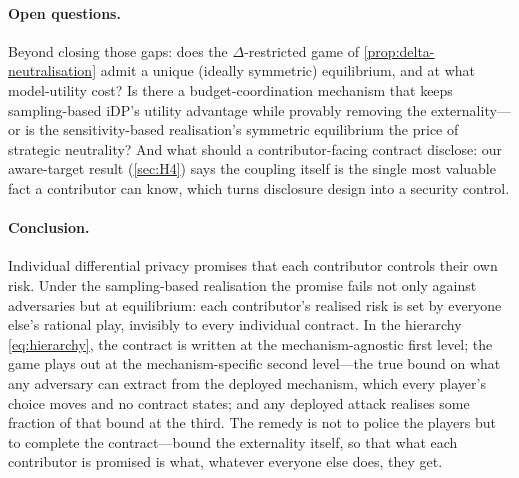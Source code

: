 \paragraph{Open questions.} Beyond closing those gaps: does the
$\Delta$-restricted game of \cref{prop:delta-neutralisation} admit a
unique (ideally symmetric) equilibrium, and at what model-utility
cost? Is there a budget-coordination mechanism that keeps
sampling-based \ac{iDP}'s utility advantage while provably removing the
externality---or is the sensitivity-based realisation's symmetric
equilibrium the price of strategic neutrality? And what should a
contributor-facing contract disclose: our aware-target result
(\cref{sec:H4}) says the coupling itself is the single most valuable
fact a contributor can know, which turns disclosure design into a
security control.

\paragraph{Conclusion.} Individual differential privacy promises that
each contributor controls their own risk. Under the sampling-based
realisation the promise fails not only against adversaries but at
equilibrium: each contributor's realised risk is set by everyone
else's rational play, invisibly to
every individual contract. In the hierarchy \eqref{eq:hierarchy}, the
contract is written at the mechanism-agnostic first level; the
game plays out at the mechanism-specific second
level---the true bound on what any adversary can extract from the
deployed mechanism, which every player's choice moves and no
contract states; and any deployed attack realises some fraction of
that bound at the third. The remedy is not to police the
players but to complete the contract---bound the externality itself,
so that what each contributor is promised is what, whatever everyone
else does, they get.
